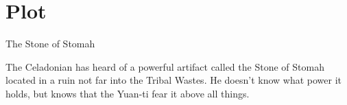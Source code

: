 \chapter{Plot}\label{ch:plot}




The Stone of Stomah

The Celadonian has heard of a powerful artifact called the Stone of Stomah located in a ruin
  not far into the Tribal Wastes.
He doesn't know what power it holds, but knows that the Yuan-ti fear it above all things.

